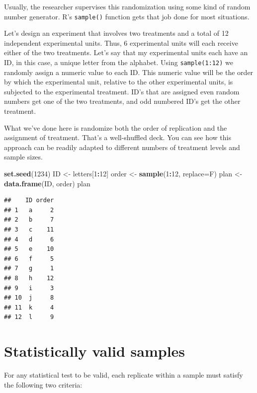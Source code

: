 \documentclass[]{book}
\newenvironment{Shaded}{\begin{snugshade}}{\end{snugshade}}
\newcommand{\DataTypeTok}[1]{\textcolor[rgb]{0.13,0.29,0.53}{#1}}
\newcommand{\DecValTok}[1]{\textcolor[rgb]{0.00,0.00,0.81}{#1}}
\newcommand{\KeywordTok}[1]{\textcolor[rgb]{0.13,0.29,0.53}{\textbf{#1}}}
\newcommand{\NormalTok}[1]{#1}
\newcommand{\OperatorTok}[1]{\textcolor[rgb]{0.81,0.36,0.00}{\textbf{#1}}}
\newcommand{\StringTok}[1]{\textcolor[rgb]{0.31,0.60,0.02}{#1}}
\begin{document}
Usually, the researcher supervises this randomization using some kind of random number generator. R's \texttt{sample()} function gets that job done for most situations.

Let's design an experiment that involves two treatments and a total of 12 independent experimental units. Thus, 6 experimental units will each receive either of the two treatments. Let's say that my experimental units each have an ID, in this case, a unique letter from the alphabet. Using \texttt{sample(1:12)} we randomly assign a numeric value to each ID. This numeric value will be the order by which the experimental unit, relative to the other experimental units, is subjected to the experimental treatment. ID's that are assigned even random numbers get one of the two treatments, and odd numbered ID's get the other treatment.

What we've done here is randomize both the order of replication and the assignment of treatment. That's a well-shuffled deck. You can see how this approach can be readily adapted to different numbers of treatment levels and sample sizes.

\begin{Shaded}
\begin{Highlighting}[]
\KeywordTok{set.seed}\NormalTok{(}\DecValTok{1234}\NormalTok{)}
\NormalTok{ID <-}\StringTok{ }\NormalTok{letters[}\DecValTok{1}\OperatorTok{:}\DecValTok{12}\NormalTok{]}
\NormalTok{order <-}\StringTok{ }\KeywordTok{sample}\NormalTok{(}\DecValTok{1}\OperatorTok{:}\DecValTok{12}\NormalTok{, }\DataTypeTok{replace=}\NormalTok{F)}
\NormalTok{plan <-}\StringTok{ }\KeywordTok{data.frame}\NormalTok{(ID, order)}
\NormalTok{plan}
\end{Highlighting}
\end{Shaded}

\begin{verbatim}
##    ID order
## 1   a     2
## 2   b     7
## 3   c    11
## 4   d     6
## 5   e    10
## 6   f     5
## 7   g     1
## 8   h    12
## 9   i     3
## 10  j     8
## 11  k     4
## 12  l     9
\end{verbatim}

\hypertarget{statistically-valid-samples}{%
\section{Statistically valid samples}\label{statistically-valid-samples}}

For any statistical test to be valid, each replicate within a sample must satisfy the following two criteria:
\end{document}
